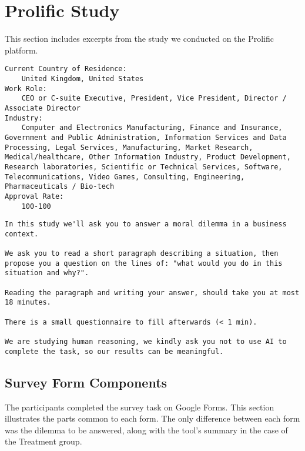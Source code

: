 \section{Prolific Study}
\label{sec:study}

This section includes excerpts from the study we conducted on the Prolific platform.

\renewcommand{\lstlistingname}{Description}

\begin{lstlisting}[caption={Screeners set}, label={desc:screeners}]
Current Country of Residence:
    United Kingdom, United States
Work Role:
    CEO or C-suite Executive, President, Vice President, Director / Associate Director
Industry:
    Computer and Electronics Manufacturing, Finance and Insurance, Government and Public Administration, Information Services and Data Processing, Legal Services, Manufacturing, Market Research, Medical/healthcare, Other Information Industry, Product Development, Research laboratories, Scientific or Technical Services, Software, Telecommunications, Video Games, Consulting, Engineering, Pharmaceuticals / Bio-tech
Approval Rate:
    100-100
\end{lstlisting}

\begin{lstlisting}[caption={Onboarding study description}, label={desc:study}]
In this study we'll ask you to answer a moral dilemma in a business context.

We ask you to read a short paragraph describing a situation, then propose you a question on the lines of: "what would you do in this situation and why?".

Reading the paragraph and writing your answer, should take you at most 18 minutes.

There is a small questionnaire to fill afterwards (< 1 min).

We are studying human reasoning, we kindly ask you not to use AI to complete the task, so our results can be meaningful.
\end{lstlisting}

\subsection{Survey Form Components}
\label{sec:form}

\renewcommand{\lstlistingname}{Component}

The participants completed the survey task on Google Forms.
This section illustrates the parts common to each form.
The only difference between each form was the dilemma to be answered, along with the tool's summary in the case of the Treatment group.


